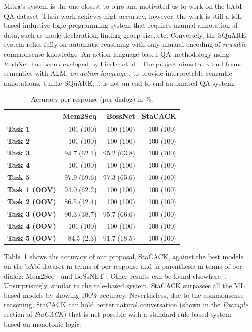 \documentclass[letterpaper]{article}
\begin{document}
Mitra's system is the one closest to ours and motivated us to work on
the bAbI QA dataset. Their work achieves high accuracy, however, the
work is still a ML based inductive logic programming system that
requires manual annotation of data, such as mode declaration, finding
group size, etc. Conversely, the SQuARE system relies fully on
automatic reasoning with only manual encoding of \textit{reusable}
commonsense knowledge. An action language based QA methodology using
VerbNet has been developed by Lierler et al \cite{ALM}. The project
aims to extend frame semantics with ALM, \textit{an action language}
\cite{ALM}, to provide interpretable semantic annotations. Unlike
SQuARE, it is not an end-to-end automated QA system.

\begin{table}
\centering
\scriptsize
\setlength{\tabcolsep}{0.72em}
\begin{tabular}{|l|*{3}{r|}}
\hline
    &  \textbf{Mem2Seq}
      & \textbf{BossNet}
    & \textbf{StaCACK}
  \\[.82em]
  \hline\hline
\textbf{Task 1}  & 100 (100) & 100 (100)  & 100 (100) \\\hline
\textbf{Task 2}  & 100 (100) & 100 (100)  & 100 (100) \\\hline
\textbf{Task 3}  & 94.7 (62.1) & 95.2 (63.8)  & 100 (100) \\\hline
\textbf{Task 4}  & 100 (100) & 100 (100)  & 100 (100) \\\hline
\textbf{Task 5}  & 97.9 (69.6) & 97.3 (65.6)  & 100 (100) \\\hline
\textbf{Task 1 (OOV)} & 94.0 (62.2) & 100 (100)   & 100 (100)\\\hline
\textbf{Task 2 (OOV)} & 86.5 (12.4)  & 100 (100) & 100 (100) \\\hline
\textbf{Task 3 (OOV)} & 90.3 (38.7) & 95.7 (66.6)  & 100 (100) \\\hline
\textbf{Task 4 (OOV)} & 100 (100) & 100 (100) & 100 (100) \\\hline
\textbf{Task 5 (OOV)} & 84.5 (2.3) & 91.7 (18.5)  & 100 (100) \\\hline

\end{tabular}

\caption{Accuracy per response (per dialog) in \%.}
\label{table:Stacack_compare}
\end{table}


Table~\ref{table:Stacack_compare} shows the accuracy of our proposal,
StaCACK, against the best models on the bAbI dataset in terms of
per-response and in parenthesis in terms of per-dialog: Mem2Seq
\cite{mem2seq}, and BoSsNET \cite{bossnet}. Other results can be found
elsewhere~\cite{babi_dialog}.
%
Unsurprisingly, similar to the rule-based system, StaCACK surpasses
all the ML based models by showing 100\% accuracy. Nevertheless, due
to the commonsense reasoning, StaCACK can hold better natural
conversation (shown in the \textit{Example} section of
\textit{StaCACK}) that is not possible with a standard rule-based
system based on monotonic logic.
\end{document}
